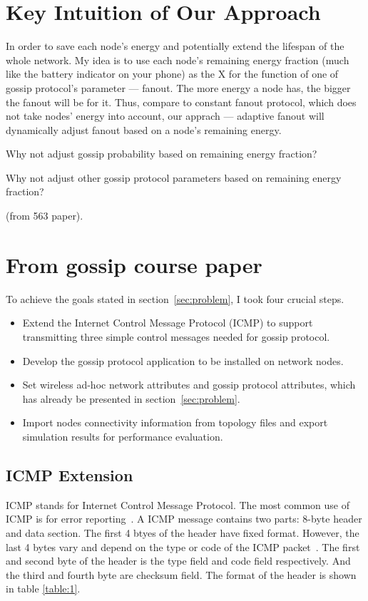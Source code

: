 \section{Key Intuition of Our Approach}

In order to save each node's energy and potentially extend the lifespan of the whole network. My idea is to use each node's remaining energy fraction (much like the battery indicator on your phone) as the X for the function of one of gossip protocol's parameter — fanout. The more energy a node has, the bigger the fanout will be for it. Thus, compare to constant fanout protocol, which does not take nodes' energy into account, our apprach — adaptive fanout will dynamically adjust fanout based on a node's remaining energy.

Why not adjust gossip probability based on remaining energy fraction?

Why not adjust other gossip protocol parameters based on remaining energy fraction?



(from 563 paper).
\section{From gossip course paper}

To achieve the goals stated in section~\ref{sec:problem}, I took four crucial steps.

\begin{itemize}
	\item Extend the Internet Control Message Protocol (ICMP) to support transmitting three simple control messages needed for gossip protocol.
	\item Develop the gossip protocol application to be installed on network nodes.
	\item Set wireless ad-hoc network attributes and gossip protocol attributes, which has already be presented in section~\ref{sec:problem}.
	\item Import nodes connectivity information from topology files and export simulation results for performance evaluation.
\end{itemize}

\subsection{ICMP Extension}

ICMP stands for Internet Control Message Protocol. The most common use of ICMP is for error reporting~\cite{james}. A ICMP message contains two parts: 8-byte header and data section. The first 4 btyes of the header have fixed format. However, the last 4 bytes vary and depend on the type or code of the ICMP packet~\cite{forouzan}. The first and second byte of the header is the type field and code field respectively. And the third and fourth byte are checksum field. The format of the header is shown in table \ref{table:1}.

